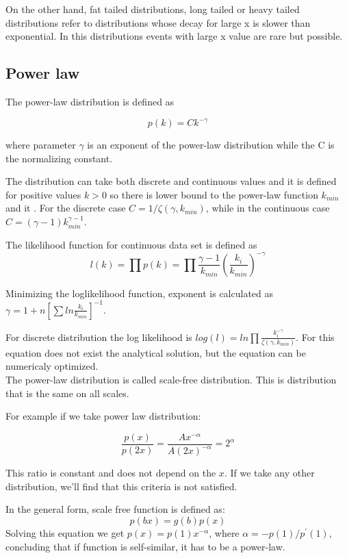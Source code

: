 On the other hand, fat tailed distributions, long tailed or heavy tailed distributions refer to distributions whose decay for large x is slower than exponential. In this distributions events with large x value are rare but possible. 

\subsection{Power law}

The power-law distribution is defined as 

\begin{equation}
p(k) = C k^{-\gamma}
\end{equation}

where parameter $\gamma$ is an exponent of the power-law distribution while the C is the normalizing constant. 

The distribution can take both discrete and continuous values and it is defined for positive values $k>0$ so there is lower bound to the power-law function $k_{min}$ and it . For the discrete case $C=1/\zeta(\gamma, k_{min})$, while in the continuous case $C=(\gamma-1)k_{min}^{\gamma-1}$. 

The likelihood function for continuous data set is defined as 
\begin{equation}
l(k) = \prod p(k) = \prod \frac{\gamma - 1}{ k_{min}}(\frac{k_i}{k_{min}})^{-\gamma}
\end{equation}

Minimizing the loglikelihood function, exponent is calculated as $\gamma = 1+n[\sum ln \frac{k_i}{k_{min}} ]^{-1}$. 

For discrete distribution the log likelihood is $log(l) = ln\prod \frac{k_i^{-\gamma}}{\zeta(\gamma, k_{min})}$. For this equation does not exist the analytical solution, but the equation can be numericaly optimized. \\

The power-law distribution is called scale-free distribution. This is distribution that is the same on all scales. 

For example if we take power law distribution:

$$\frac{p(x)}{p(2x)} = \frac{Ax^{-\alpha}}{A(2x)^{-\alpha}} = 2^{\alpha}$$ 

This ratio is constant and does not depend on the $x$. If we take any other distribution, we'll find that this criteria is not satisfied. 

In the general form, scale free function is defined as:
$$p(bx) = g(b)p(x)$$ 
Solving this equation we get $p(x)=p(1)x^{-\alpha}$, where $\alpha=-p(1)/p^{'}(1)$, concluding that if function is self-similar, it has to be a power-law. 






